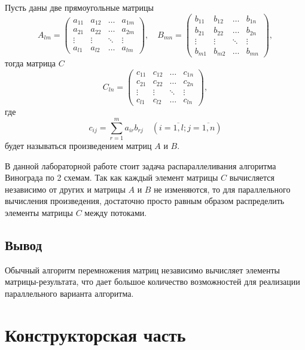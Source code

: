 \documentclass[12pt]{report}
\begin{document}
Пусть даны две прямоугольные матрицы
\begin{equation}
A_{lm} = \begin{pmatrix}
a_{11} & a_{12} & \ldots & a_{1m}\\
a_{21} & a_{22} & \ldots & a_{2m}\\
\vdots & \vdots & \ddots & \vdots\\
a_{l1} & a_{l2} & \ldots & a_{lm}
\end{pmatrix},
\quad
B_{mn} = \begin{pmatrix}
b_{11} & b_{12} & \ldots & b_{1n}\\
b_{21} & b_{22} & \ldots & b_{2n}\\
\vdots & \vdots & \ddots & \vdots\\
b_{m1} & b_{m2} & \ldots & b_{mn}
\end{pmatrix},
\end{equation}
тогда матрица $C$
\begin{equation}
C_{ln} = \begin{pmatrix}
c_{11} & c_{12} & \ldots & c_{1n}\\
c_{21} & c_{22} & \ldots & c_{2n}\\
\vdots & \vdots & \ddots & \vdots\\
c_{l1} & c_{l2} & \ldots & c_{ln}
\end{pmatrix},
\end{equation}
где
\begin{equation}
\label{eq:M}
c_{ij} =
\sum_{r=1}^{m} a_{ir}b_{rj} \quad (i=\overline{1,l}; j=\overline{1,n})
\end{equation}
будет называться произведением матриц $A$ и $B$.


В данной лабораторной работе стоит задача распараллеливания алгоритма Винограда по 2 схемам. Так как каждый элемент матрицы $C$ вычисляется независимо от других и матрицы $A$ и $B$ не изменяются, то для параллельного вычисления произведения, достаточно просто равным образом распределить элементы матрицы $C$ между потоками.



\section{Вывод}
	Обычный алгоритм перемножения матриц независимо вычисляет элементы матрицы-результата, что дает большое количество возможностей для реализации параллельного варианта алгоритма.
\clearpage


\chapter{Конструкторская часть}
\end{document}

